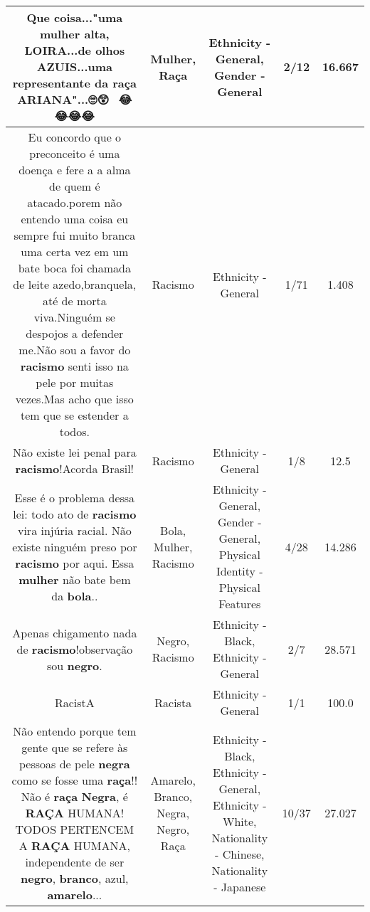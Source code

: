 \documentclass[11pt]{article}
\newlength\mylength
\begin{document}
\begin{center}
\begin{longtable}{|C{.65\mylength}|C{.30\mylength}|C{.12\mylength}|C{.12\mylength}|C{.12\mylength}|}
  \small Que coisa..."uma \textbf{mulher} alta, LOIRA...de olhos AZUIS...uma representante da \textbf{raça} ARIANA"...🙄😲🤨🤔🤣😂😂😂😂\normalsize   & Mulher, Raça & Ethnicity - General, Gender - General & 2/12 & 16.667 \\  \hline
  \small Eu concordo que o preconceito é uma doença e fere a a alma de quem é atacado.porem não entendo uma coisa eu sempre fui muito branca uma certa vez em um bate boca foi chamada de leite azedo,branquela, até de morta viva.Ninguém se despojos a defender me.Não sou a favor do \textbf{racismo} senti isso na pele por muitas vezes.Mas acho que isso tem que se estender a todos.\normalsize   & Racismo & Ethnicity - General & 1/71 & 1.408 \\  \hline
  \small Não existe lei penal para \textbf{racismo}!Acorda Brasil!\normalsize   & Racismo & Ethnicity - General & 1/8 & 12.5 \\  \hline
  \small Esse é o problema dessa lei: todo ato de \textbf{racismo} vira injúria racial. Não existe ninguém preso por \textbf{racismo} por aqui. Essa \textbf{mulher} não bate bem da \textbf{bola}..\normalsize   & Bola, Mulher, Racismo & Ethnicity - General, Gender - General, Physical Identity - Physical Features & 4/28 & 14.286 \\  \hline
  \small Apenas chigamento nada de \textbf{racismo}!observação sou \textbf{negro}.\normalsize   & Negro, Racismo & Ethnicity - Black, Ethnicity - General & 2/7 & 28.571 \\  \hline
  \small RacistA\normalsize   & Racista & Ethnicity - General & 1/1 & 100.0 \\  \hline
  \small Não entendo porque tem gente que se refere às pessoas de pele \textbf{negra} como se fosse uma \textbf{raça}!! Não é \textbf{raça} \textbf{Negra}, é \textbf{RAÇA} HUMANA! TODOS PERTENCEM A \textbf{RAÇA} HUMANA, independente de ser \textbf{negro}, \textbf{branco}, azul, \textbf{a\textbf{marelo}}...\normalsize   & Amarelo, Branco, Negra, Negro, Raça & Ethnicity - Black, Ethnicity - General, Ethnicity - White, Nationality - Chinese, Nationality - Japanese & 10/37 & 27.027 \\  \hline

\end{longtable}
\end{center}
\end{document}
